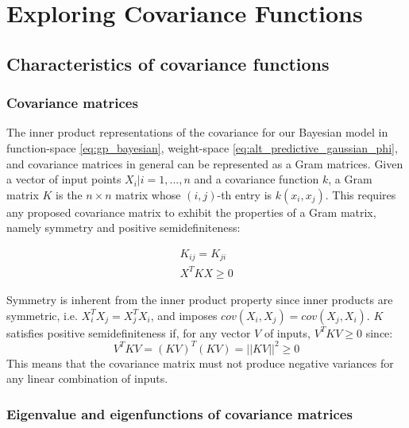\section{Exploring Covariance Functions}


\subsection{Characteristics of covariance functions \cite{gp-ml}}

\subsubsection{Covariance matrices}
The inner product representations of the covariance for our Bayesian model in function-space \ref{eq:gp_bayesian}, weight-space \ref{eq:alt_predictive_gaussian_phi}, and covariance matrices in general can be represented as a Gram matrices. Given a vector of input points ${X_i | i = 1, ..., n}$ and a covariance function $k$, a Gram matrix $K$ is the $n \times n$ matrix whose $(i,j)$-th entry is $k(x_i, x_j)$. This requires any proposed covariance matrix to exhibit the properties of a Gram matrix, namely symmetry and positive semidefiniteness:

\begin{equation*}
    \begin{aligned}
        K_{ij} = K_{ji} \\
        X^T K X \geq 0
    \end{aligned}
\end{equation*}

Symmetry is inherent from the inner product property since inner products are symmetric, i.e. $X_i^T X_j = X_j^T X_i$, and imposes $cov(X_i, X_j) = cov(X_j, X_i)$. $K$ satisfies positive semidefiniteness if, for any vector $V$ of inputs, $V^T K V \geq 0$ since:
\begin{equation*}
    V^T K V = (K V)^T (K V) = ||K V||^2 \geq 0
\end{equation*}
This means that the covariance matrix must not produce negative variances for any linear combination of inputs.


\subsubsection{Eigenvalue and eigenfunctions of covariance matrices}

